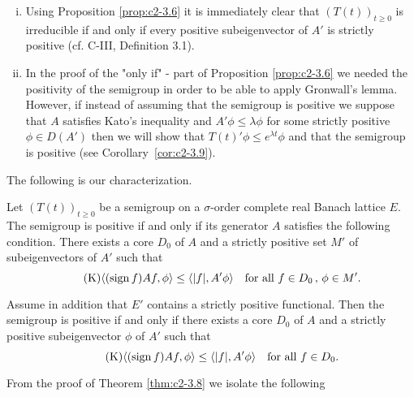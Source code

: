 \begin{remark}\label{rem:c2-3.7}
\begin{enumerate}[(i), wide, labelsep=1em, itemindent=\parindent]
\item \label{rem:c2-3.7-1}
Using Proposition \ref{prop:c2-3.6} it is immediately clear that
$(T(t))_{t \geq 0}$ is irreducible if and only if every positive subeigenvector
of $A'$ is strictly positive (cf. C-III, Definition 3.1).
\item \label{rem:c2-3.7-2}
In the proof of the "only if" - part of Proposition \ref{prop:c2-3.6} we needed the
positivity of the semigroup in order to be able to apply Gronwall's
lemma.
However, if instead of assuming that the semigroup is positive
we suppose that $A$ satisfies Kato's inequality and $A'\phi \leq \lambda\phi$ for some strictly positive $\phi \in D(A')$ then we will show that $T(t)'\phi \leq
e^{\lambda t} \phi$ and that the semigroup is positive (see Corollary~\ref{cor:c2-3.9}).
\end{enumerate}
\end{remark}

The following is our characterization.

\begin{theorem}\label{thm:c2-3.8}
Let $(T(t))_{t \geq 0}$ be a semigroup on a $\sigma$-order complete
real Banach lattice $E$. The semigroup is positive if and only if its
generator $A$ satisfies the following condition.
There exists a core $D_{0}$ of $A$ and a strictly positive set $M'$ of
subeigenvectors of $A'$ such that
\begin{equation}\label{eq:c2-K4} \tag{K}
\langle(\operatorname{sign} f) Af,\phi \rangle \leq \langle|f|,A'\phi\rangle \quad \text{for all } f \in D_{0} \, , \, \phi \in M'.
\end{equation}
\end{theorem}
\begin{corollary}\label{cor:c2-3.9}
Assume in addition that $E'$ contains a strictly positive functional. 
Then the semigroup is positive if and only if there
exists a core $D_{0}$ of $A$ and a strictly positive subeigenvector $\phi$
of $A'$ such that
\begin{equation}\label{eq:c2-K5} \tag{K}
\langle(\operatorname{sign} f) Af,\phi \rangle \leq \langle|f|,A'\phi\rangle \quad \text{for all } f \in D_{0}.
\end{equation}
\end{corollary}

From the proof of Theorem \ref{thm:c2-3.8}   we isolate the following


